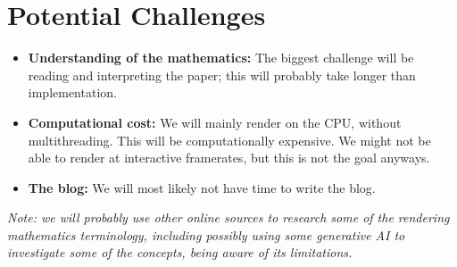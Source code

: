 \documentclass{article}
\begin{document}
\section{Potential Challenges}
\begin{itemize}
    \item \textbf{Understanding of the mathematics:} The biggest challenge will be reading and interpreting the paper; this will probably take longer than implementation.
    \item \textbf{Computational cost:} We will mainly render on the CPU, without multithreading. This will be computationally expensive. We might not be able to render at interactive framerates, but this is not the goal anyways.
    \item \textbf{The blog:} We will most likely not have time to write the blog.
\end{itemize}

\noindent \textit{Note: we will probably use other online sources to research some of the rendering mathematics terminology, including possibly using some generative AI to investigate some of the concepts, being aware of its limitations.}



\end{document}
